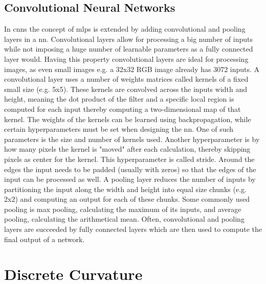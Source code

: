 \subsection{Convolutional Neural Networks}
In \ac{cnn}s the concept of \ac{mlp}s is extended by adding convolutional and pooling layers in a \ac{nn}. Convolutional layers allow for processing a big number of inputs while not imposing a huge number of learnable parameters as a fully connected layer would. Having this property convolutional layers are ideal for processing images, as even small images e.g. a 32x32 RGB image already has 3072 inputs.
A convolutional layer uses a number of weights matrices called kernels of a fixed small size (e.g. 5x5). These kernels are convolved across the inputs width and height, meaning the dot product of the filter and a specific local region is computed for each input thereby computing a two-dimensional map of that kernel. The weights of the kernels can be learned using backpropagation, while certain hyperparameters must be set when designing the \ac{nn}. One of such parameters is the size and number of kernels used. Another hyperparameter is by how many pixels the kernel is "moved" after each calculation, thereby skipping pixels as center for the kernel. This hyperparameter is called stride. Around the edges the input needs to be padded (usually with zeros) so that the edges of the input can be processed as well.
A pooling layer reduces the number of inputs by partitioning the input along the width and height into equal size chunks (e.g. 2x2) and computing an output for each of these chunks. Some commonly used pooling is max pooling, calculating the maximum of its inputs, and average pooling, calculating the arithmetical mean.
Often, convolutional and pooling layers are succeeded by fully connected layers which are then used to compute the final output of a network.

%

\section{Discrete Curvature}

